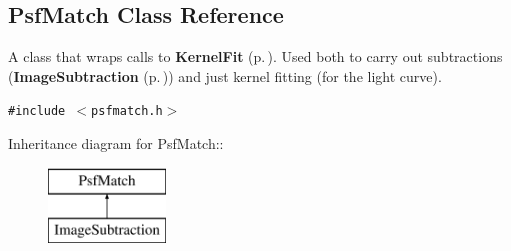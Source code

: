 \subsection{Psf\-Match  Class Reference}
\label{class_psfmatch}
A class that wraps calls to {\bf Kernel\-Fit} {\rm (p.\,\pageref{class_kernelfit})}. Used both to carry out subtractions ({\bf Image\-Subtraction} {\rm (p.\,\pageref{class_imagesubtraction})}) and just kernel fitting (for the light curve). 


{\tt \#include $<$psfmatch.h$>$}

Inheritance diagram for Psf\-Match::\begin{figure}[H]
\begin{center}
\leavevmode
\includegraphics[height=2cm]{class_psfmatch}
\end{center}
\end{figure}
